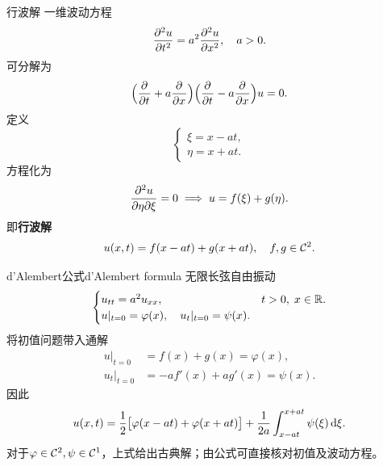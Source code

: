 \begin{example}
	{行波解}{}
	一维波动方程
	\[
		\pv[2]ut = a^2\pv[2]ux,\quad a > 0.
	\]
	可分解为
	\[
		\Bigp{\pp t + a\pp x}\Bigp{\pp t - a\pp x}u = 0.
	\]
	定义
	\[
		\begin{cases}
			\xi = x - at, \\
			\eta = x + at.
		\end{cases}
	\]
	方程化为
	\[
		\pw u\eta\xi = 0 \implies u = f(\xi) + g(\eta).
	\]
	即\textbf{行波解}
	\begin{align}
		u(x,t) = f(x - at) + g(x + at),\quad f,g \in \cont^2.
	\end{align}
\end{example}
\begin{theorem}{d'Alembert公式}{d'Alembert formula}
	无限长弦自由振动
	\begin{equation}
		\label{eq:mmp-cauchy-wave-data}
		\begin{cases}
			u_{tt} = a^2u_{xx},&t > 0,\;x \in \RR. \\
			u|_{t=0} = \varphi(x),\quad u_t|_{t=0} = \psi(x).
		\end{cases}
	\end{equation}
	将初值问题带入通解
	\begin{align*}
		u|_{t=0} & = f(x) + g(x) = \varphi(x),   \\
		u_t|_{t=0} & = -af'(x) + ag'(x) = \psi(x).
	\end{align*}
	因此
	\begin{align}
		u(x,t) = \frac12\bigb{\varphi(x - at) + \varphi(x + at)} + \frac1{2a}\int_{x-at}^{x+at}\psi(\xi)\d\xi.
	\end{align}
	对于$\varphi \in \cont^2,\psi \in \cont^1$，上式给出古典解；由公式可直接核对初值及波动方程。
\end{theorem}

